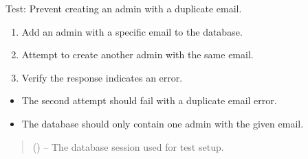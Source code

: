 \documentclass[letterpaper,10pt,english]{sphinxmanual}
\begin{document}

\begin{fulllineitems}
\label{\detokenize{test:test.test_admin.test_create_admin_duplicate_email}}
\pysigstartsignatures
\pysiglinewithargsret
{}
{}
{}
\pysigstopsignatures
\sphinxAtStartPar
Test: Prevent creating an admin with a duplicate email.
\begin{description}
\begin{enumerate}
%
\item {} 
\sphinxAtStartPar
Add an admin with a specific email to the database.

\item {} 
\sphinxAtStartPar
Attempt to create another admin with the same email.

\item {} 
\sphinxAtStartPar
Verify the response indicates an error.

\end{enumerate}

\begin{itemize}
\item {} 
\sphinxAtStartPar
The second attempt should fail with a duplicate email error.

\item {} 
\sphinxAtStartPar
The database should only contain one admin with the given email.

\end{itemize}

\end{description}
\begin{quote}\begin{description}
\sphinxAtStartPar
{} () – The database session used for test setup.

\end{description}\end{quote}

\end{fulllineitems}
\end{document}
